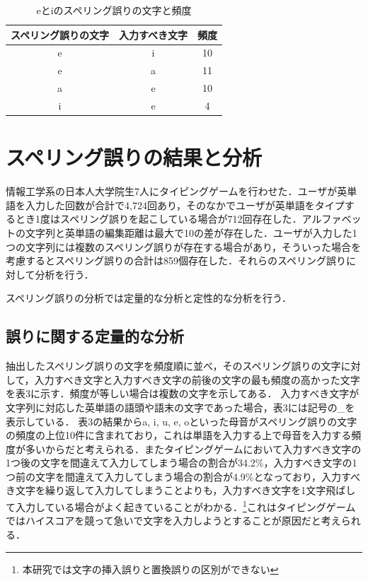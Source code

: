 \documentclass{jarticle}
\begin{document}
 \begin{table}[t]
  \small
  \begin{center}
   \caption{eとiのスペリング誤りの文字と頻度}
   \begin{tabular}{|c|c|c|} \hline
       	スペリング誤りの文字 & 入力すべき文字 & 頻度\\ \hline
	    e & i & 10\\ \hline
	    e & a & 11\\ \hline
	    a & e & 10\\ \hline
	    i & e & 4\\ \hline
   \end{tabular}
  \end{center}
 \end{table}

\section{スペリング誤りの結果と分析}
情報工学系の日本人大学院生7人にタイピングゲームを行わせた．ユーザが英単語を入力した回数が合計で4,724回あり，そのなかでユーザが英単語をタイプするとき1度はスペリング誤りを起こしている場合が712回存在した．アルファベットの文字列と英単語の編集距離は最大で10の差が存在した．ユーザが入力した1つの文字列には複数のスペリング誤りが存在する場合があり，そういった場合を考慮するとスペリング誤りの合計は859個存在した．それらのスペリング誤りに対して分析を行う．

スペリング誤りの分析では定量的な分析と定性的な分析を行う．

\subsection{誤りに関する定量的な分析}
抽出したスペリング誤りの文字を頻度順に並べ，そのスペリング誤りの文字に対して，入力すべき文字と入力すべき文字の前後の文字の最も頻度の高かった文字を表3に示す．頻度が等しい場合は複数の文字を示してある．
入力すべき文字が文字列に対応した英単語の語頭や語末の文字であった場合，表3には記号の\_を表示している．
表3の結果からa, i, u, e, oといった母音がスペリング誤りの文字の頻度の上位10件に含まれており，これは単語を入力する上で母音を入力する頻度が多いからだと考えられる．またタイピングゲームにおいて入力すべき文字の1つ後の文字を間違えて入力してしまう場合の割合が34.2\%，入力すべき文字の1つ前の文字を間違えて入力してしまう場合の割合が4.9\%となっており，入力すべき文字を繰り返して入力してしまうことよりも，入力すべき文字を1文字飛ばして入力している場合がよく起きていることがわかる．\footnote{本研究では文字の挿入誤りと置換誤りの区別ができない}これはタイピングゲームではハイスコアを競って急いで文字を入力しようとすることが原因だと考えられる．
\end{document}
